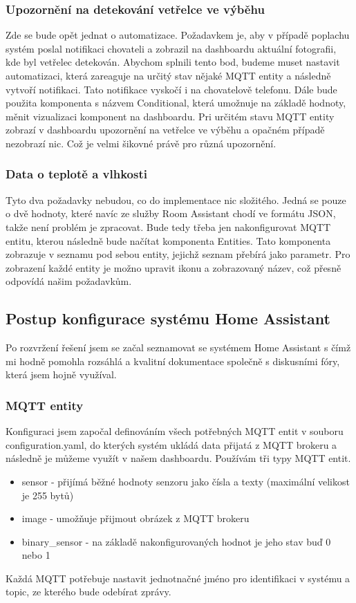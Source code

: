 \subsubsection*{Upozornění na detekování vetřelce ve výběhu}
Zde se bude opět jednat o automatizace.
Požadavkem je, aby v případě poplachu systém poslal notifikaci chovateli a zobrazil na dashboardu aktuální fotografii, kde byl vetřelec detekován.\newline
Abychom splnili tento bod, budeme muset nastavit automatizaci, která zareaguje na určitý stav nějaké MQTT entity a následně vytvoří notifikaci.
Tato notifikace vyskočí i na chovatelově telefonu.
Dále bude použita komponenta s názvem Conditional, která umožnuje na základě hodnoty, měnit vizualizaci komponent na dashboardu.
Pri určitém stavu MQTT entity zobrazí v dashboardu upozornění na vetřelce ve výběhu a opačném případě nezobrazí nic.
Což je velmi šikovné právě pro různá upozornění.

\subsubsection*{Data o teplotě a vlhkosti}
Tyto dva požadavky nebudou, co do implementace nic složitého.
Jedná se pouze o dvě hodnoty, které navíc ze služby Room Assistant chodí ve formátu JSON, takže není problém je zpracovat.\newline
Bude tedy třeba jen nakonfigurovat MQTT entitu, kterou následně bude načítat komponenta Entities.
Tato komponenta zobrazuje v seznamu pod sebou entity, jejichž seznam přebírá jako parametr.
Pro zobrazení každé entity je možno upravit ikonu a zobrazovaný název, což přesně odpovídá našim požadavkům.

\subsection{Postup konfigurace systému Home Assistant}
Po rozvržení řešení jsem se začal seznamovat se systémem Home Assistant s čímž mi hodně pomohla rozsáhlá a kvalitní dokumentace společně s diskusními fóry, která jsem hojně využíval.
\subsubsection*{MQTT entity}
Konfiguraci jsem započal definováním všech potřebných MQTT entit v souboru configuration.yaml, do kterých systém ukládá data přijatá z MQTT brokeru a následně je můžeme využít v našem dashboardu.
Používám tři typy MQTT entit.
\begin{itemize}
    \item sensor - přijímá běžné hodnoty senzoru jako čísla a texty (maximální velikost je 255 bytů)
    \item image - umožňuje přijmout obrázek z MQTT brokeru
    \item binary\_sensor - na základě nakonfigurovaných hodnot je jeho stav buď 0 nebo 1
\end{itemize}
Každá MQTT potřebuje nastavit jednotnačné jméno pro identifikaci v systému a topic, ze kterého bude odebírat zprávy.

